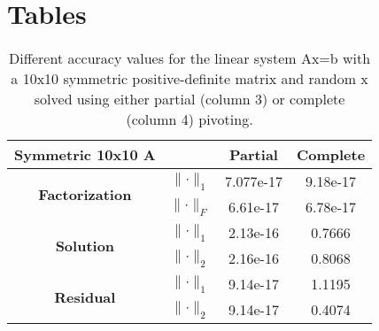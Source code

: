\documentclass[11pt]{article}
\newcommand{\norm}[1]{\lVert#1\rVert}
\begin{document}
\section{Tables}

\begin{table}[h]
	\centering
	\begin{tabular}{|c|c|c|c|}
	\hline
	\textbf{Symmetric 10x10 A}                    &          		& \textbf{Partial} & \textbf{Complete} \\ \hline
	\multirow{2}{*}{\textbf{Factorization}} &  $\norm{\cdot}_1$ & 7.077e-17        & 9.18e-17          \\ \cline{2-4} 
	                                        			 & $\norm{\cdot}_F$ & 6.61e-17         & 6.78e-17          \\ \hline
	\multirow{2}{*}{\textbf{Solution}}         &  $\norm{\cdot}_1$ & 2.13e-16         & 0.7666            \\ \cline{2-4} 
	                                        			 &  $\norm{\cdot}_2$ & 2.16e-16         & 0.8068            \\ \hline
	\multirow{2}{*}{\textbf{Residual}}        &  $\norm{\cdot}_1$ & 9.14e-17         & 1.1195            \\ \cline{2-4} 
	                                        			 &  $\norm{\cdot}_2$ & 9.14e-17         & 0.4074            \\ \hline
	\end{tabular}
	\caption{Different accuracy values for the linear system Ax=b with a 10x10 symmetric positive-definite matrix and random x solved using either partial (column 3) or complete (column 4) pivoting.}
	\label{tab:sym10}
\end{table}
\end{document}
